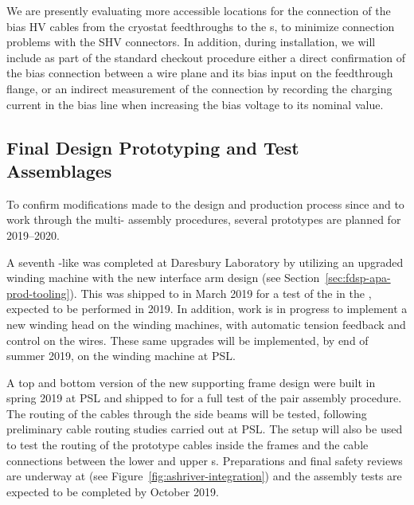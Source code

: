 We are presently evaluating more accessible locations for the connection of the bias HV cables from the cryostat feedthroughs to the s, to minimize connection problems with the SHV connectors. In addition, during installation, we will include as part of the standard checkout procedure either a direct confirmation of the bias connection between a wire plane and its bias input on the feedthrough flange, or an indirect measurement of the connection by recording the charging current in the bias line when increasing the bias voltage to its nominal value.


\subsection{Final Design Prototyping and Test Assemblages}
\label{sec:fdsp-apa-qa-prototyping}


To confirm modifications made to the  design and production process since  and to work through the multi- assembly procedures, several prototypes are planned for 2019--2020.

A seventh -like  was completed at Daresbury Laboratory by utilizing an upgraded winding machine with the new interface arm design (see Section~\ref{sec:fdsp-apa-prod-tooling}). This  was shipped to  in March 2019 for a test of the  in the \coldbox, expected to be performed in 2019. In addition, work is in progress to implement a new winding head on the  winding machines, with automatic tension feedback and control on the wires. These same upgrades will be implemented, by end of summer 2019, on the winding machine at PSL. %

A top and bottom version of the new supporting  frame design were built in spring 2019 at PSL and shipped to  for a full test of the  pair %
assembly procedure.  The routing of the  cables through the  side beams will be tested, following preliminary cable routing studies carried out at PSL. The  setup will also be used to test the routing of the  prototype cables inside the  frames and the cable connections between the lower and upper s.  Preparations and final safety reviews are underway at  (see Figure~\ref{fig:ashriver-integration}) and the  assembly tests are expected to be completed by October 2019.  

